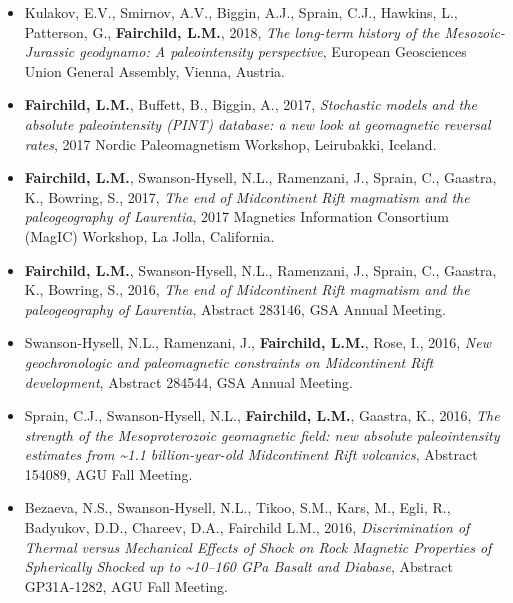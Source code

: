 \documentclass[11pt,a4paper,sans]{moderncv}
\begin{document}
\begin{itemize}
    \setlength{\itemsep}{2pt}

    \item{Kulakov, E.V., Smirnov, A.V., Biggin, A.J., Sprain, C.J., Hawkins, L.,
            Patterson, G., \textbf{Fairchild, L.M.}, 2018, \textit{The long-term
                history of the Mesozoic-Jurassic geodynamo: A paleointensity
            perspective}, European Geosciences Union General Assembly, Vienna,
        Austria.}

    \item{\textbf{Fairchild, L.M.}, Buffett, B., Biggin, A., 2017,
            \textit{Stochastic models and the absolute paleointensity (PINT)
            database: a new look at geomagnetic reversal rates}, 2017 Nordic
        Paleomagnetism Workshop, Leirubakki, Iceland.}

    \item{\textbf{Fairchild, L.M.}, Swanson-Hysell, N.L., Ramenzani, J., Sprain,
            C., Gaastra, K., Bowring, S., 2017, \textit{The end of Midcontinent
            Rift magmatism and the paleogeography of Laurentia}, 2017 Magnetics
        Information Consortium (MagIC) Workshop, La Jolla, California.}

    \item{\textbf{Fairchild, L.M.}, Swanson-Hysell, N.L., Ramenzani, J., Sprain,
            C., Gaastra, K., Bowring, S., 2016, \textit{The end of Midcontinent
            Rift magmatism and the paleogeography of Laurentia}, Abstract
        283146, GSA Annual Meeting.}

    \item{Swanson-Hysell, N.L., Ramenzani, J., \textbf{Fairchild, L.M.}, Rose,
            I., 2016, \textit{New geochronologic and paleomagnetic constraints
            on Midcontinent Rift development}, Abstract 284544, GSA Annual
        Meeting.}

    \item{Sprain, C.J., Swanson-Hysell, N.L., \textbf{Fairchild, L.M.}, Gaastra,
            K., 2016, \textit{The strength of the Mesoproterozoic geomagnetic
                field: new absolute paleointensity estimates from
                \textasciitilde 1.1 billion-year-old Midcontinent Rift
        volcanics}, Abstract 154089, AGU Fall Meeting.}

    \item{Bezaeva, N.S., Swanson-Hysell, N.L., Tikoo, S.M., Kars, M., Egli, R.,
            Badyukov, D.D., Chareev, D.A., Fairchild L.M., 2016,
            \textit{Discrimination of Thermal versus Mechanical Effects of Shock
                on Rock Magnetic Properties of Spherically Shocked up to
            \textasciitilde 10--160 GPa Basalt and Diabase}, Abstract
        GP31A-1282, AGU Fall Meeting.}


\end{itemize}
\end{document}

